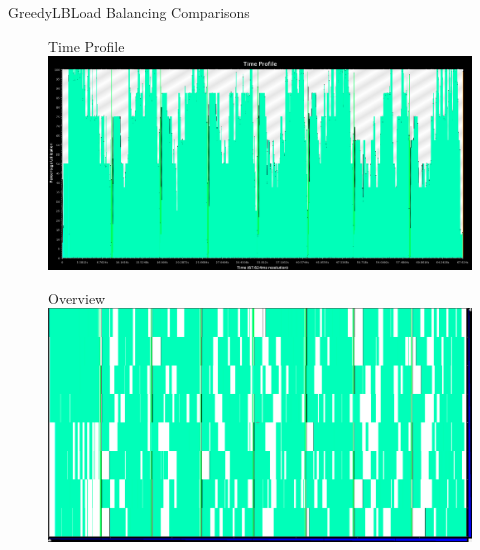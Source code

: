\documentclass[]{beamer}
\begin{document}
\begin{frame}{GreedyLB}{Load Balancing Comparisons}
  \begin{figure}{Time Profile}
    \includegraphics[width=.65\paperwidth,height=.35\paperheight]{figures/LoadBalancing/TimeProfileGreedyLB}
  \end{figure}
  \begin{figure}{\hspace{15pt}Overview}
    \includegraphics[width=.65\paperwidth,height=.35\paperheight]{figures/LoadBalancing/OverviewGreedyLB}
  \end{figure}
\end{frame}
\end{document}
